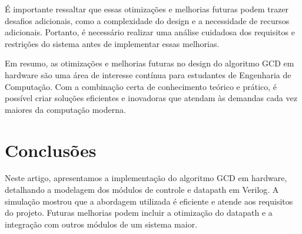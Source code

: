 \documentclass[a4paper,11pt]{article} %
\begin{document}
É importante ressaltar que essas otimizações e melhorias futuras podem trazer desafios adicionais, como a complexidade do design e a necessidade de recursos adicionais. Portanto, é necessário realizar uma análise cuidadosa dos requisitos e restrições do sistema antes de implementar essas melhorias.


Em resumo, as otimizações e melhorias futuras no design do algoritmo GCD em hardware são uma área de interesse contínua para estudantes de Engenharia de Computação. Com a combinação certa de conhecimento teórico e prático, é possível criar soluções eficientes e inovadoras que atendam às demandas cada vez maiores da computação moderna.


\section{Conclusões}

Neste artigo, apresentamos a implementação do algoritmo GCD em hardware, detalhando a modelagem dos módulos de controle e datapath em Verilog. A simulação mostrou que a abordagem utilizada é eficiente e atende aos requisitos do projeto. Futuras melhorias podem incluir a otimização do datapath e a integração com outros módulos de um sistema maior.


\end{document}
